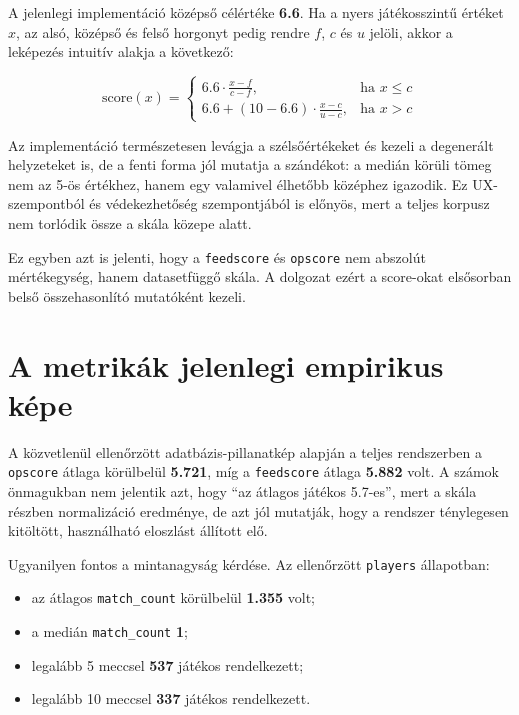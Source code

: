 \documentclass[a4paper,12pt]{report}
\begin{document}
A jelenlegi implementáció középső célértéke \textbf{6.6}. Ha a nyers játékosszintű értéket $x$, az alsó, középső és felső horgonyt pedig rendre $f$, $c$ és $u$ jelöli, akkor a leképezés intuitív alakja a következő:

\begin{equation}
\text{score}(x)=
\begin{cases}
6.6 \cdot \frac{x-f}{c-f}, & \text{ha } x \le c \\
6.6 + (10-6.6)\cdot \frac{x-c}{u-c}, & \text{ha } x > c
\end{cases}
\end{equation}

Az implementáció természetesen levágja a szélsőértékeket és kezeli a degenerált helyzeteket is, de a fenti forma jól mutatja a szándékot: a medián körüli tömeg nem az 5-ös értékhez, hanem egy valamivel élhetőbb középhez igazodik. Ez UX-szempontból és védekezhetőség szempontjából is előnyös, mert a teljes korpusz nem torlódik össze a skála közepe alatt.

Ez egyben azt is jelenti, hogy a \texttt{feedscore} és \texttt{opscore} nem abszolút mértékegység, hanem datasetfüggő skála. A dolgozat ezért a score-okat elsősorban belső összehasonlító mutatóként kezeli.

\section{A metrikák jelenlegi empirikus képe}

A közvetlenül ellenőrzött adatbázis-pillanatkép alapján a teljes rendszerben a \texttt{opscore} átlaga körülbelül \textbf{5.721}, míg a \texttt{feedscore} átlaga \textbf{5.882} volt. A számok önmagukban nem jelentik azt, hogy ``az átlagos játékos 5.7-es'', mert a skála részben normalizáció eredménye, de azt jól mutatják, hogy a rendszer ténylegesen kitöltött, használható eloszlást állított elő.

Ugyanilyen fontos a mintanagyság kérdése. Az ellenőrzött \texttt{players} állapotban:

\begin{itemize}
    \item az átlagos \texttt{match\_count} körülbelül \textbf{1.355} volt;
    \item a medián \texttt{match\_count} \textbf{1};
    \item legalább 5 meccsel \textbf{537} játékos rendelkezett;
    \item legalább 10 meccsel \textbf{337} játékos rendelkezett.
\end{itemize}
\end{document}
